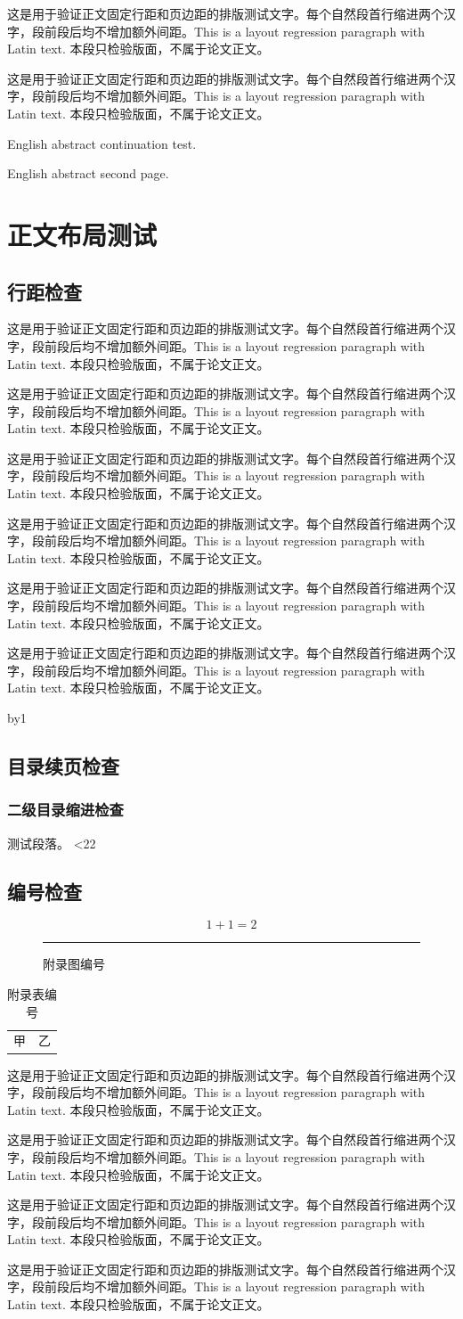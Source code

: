 \documentclass[degree=master,degreetype=academic]{tongjithesis}
\newcommand{\auditparagraph}{%
这是用于验证正文固定行距和页边距的排版测试文字。每个自然段首行缩进两个汉字，段前段后均不增加额外间距。This is a layout regression paragraph with Latin text. 本段只检验版面，不属于论文正文。\par}
\begin{document}
\frontmatter
\makeatletter
\begin{cabstract}
\auditparagraph\newpage\auditparagraph
\end{cabstract}
\begin{eabstract}
English abstract continuation test.\par\newpage
English abstract second page.
\end{eabstract}
\tongji@makeabstract
\makeatother
\tableofcontents
\mainmatter
\chapter{正文布局测试}
\section{行距检查}
\auditparagraph\auditparagraph\auditparagraph
\clearpage
\auditparagraph\auditparagraph\auditparagraph
\newcount\sectiontest
{}
\loop\advance\sectiontest by1
  \section{目录续页检查\the\sectiontest}
  \subsection{二级目录缩进检查}
  测试段落。
\ifnum\sectiontest<22\repeat
\backmatter
\begin{reference}
\nocite{*}\printbibliography[heading=none]
\end{reference}
\begin{appendix}
\chapter{编号检查}
\begin{equation}1+1=2\end{equation}
\begin{figure}[h]\centering\rule{10mm}{10mm}\caption{附录图编号}\end{figure}
\begin{table}[h]\centering\caption{附录表编号}\begin{tabular}{cc}甲&乙\end{tabular}\end{table}
\end{appendix}
\begin{acknowledgement}\auditparagraph\newpage\auditparagraph\end{acknowledgement}
\begin{resume}\auditparagraph\newpage\auditparagraph\end{resume}
\end{document}
